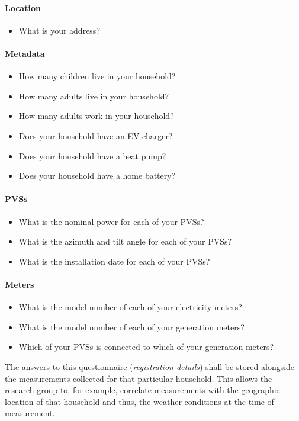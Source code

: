 \paragraph{Location}
\begin{itemize}
  \item What is your address?
\end{itemize}

\paragraph{Metadata}
\begin{itemize}
  \item How many children live in your household?
  \item How many adults live in your household?
  \item How many adults work in your household?
  \item Does your household have an \acs{EV} charger?
  \item Does your household have a heat pump?
  \item Does your household have a home battery?
\end{itemize}

\paragraph{\aclp{PVS}}
\begin{itemize}
  \item What is the nominal power for each of your \acp{PVS}?
  \item What is the azimuth and tilt angle for each of your \acp{PVS}?
  \item What is the installation date for each of your \acp{PVS}?
\end{itemize}

\paragraph{Meters}
\begin{itemize}
  \item What is the model number of each of your electricity meters?
  \item What is the model number of each of your generation meters?
  \item Which of your \acsp{PVS} is connected to which of your generation meters?
\end{itemize}

The answers to this questionnaire (\textit{registration details}) shall be stored alongside the measurements  collected for that particular household. This allows the research group to, for example, correlate measurements with the geographic location of that household and thus, the weather conditions at the time of measurement.


